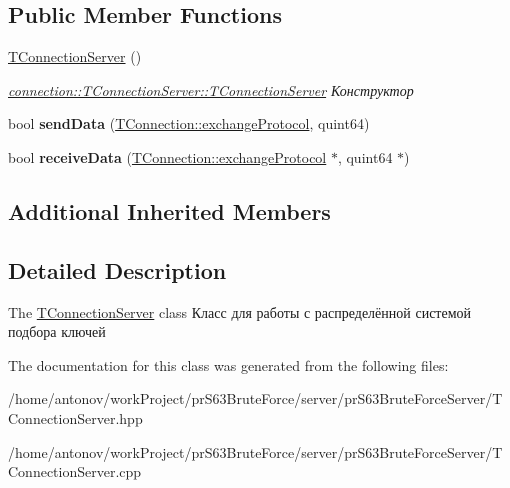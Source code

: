 \subsection*{Public Member Functions}
\begin{DoxyCompactItemize}
\item 
\mbox{\label{classconnection_1_1_t_connection_server_a823a7c07aaea7a3ab3ea1a854a1cd3a0}} 
\hyperlink{classconnection_1_1_t_connection_server_a823a7c07aaea7a3ab3ea1a854a1cd3a0}{T\+Connection\+Server} ()
\begin{DoxyCompactList}\small\item\em \hyperlink{classconnection_1_1_t_connection_server_a823a7c07aaea7a3ab3ea1a854a1cd3a0}{connection\+::\+T\+Connection\+Server\+::\+T\+Connection\+Server} Конструктор \end{DoxyCompactList}\item 
\mbox{\label{classconnection_1_1_t_connection_server_a481b658bc12f7bb0b5fee3ccef2937ff}} 
bool {\bfseries send\+Data} (\hyperlink{classconnection_1_1_t_connection_a3550181cb2fa72eccfa55d23f45cea34}{T\+Connection\+::exchange\+Protocol}, quint64)
\item 
\mbox{\label{classconnection_1_1_t_connection_server_a40b7cdfa826bf501fdb165e965511736}} 
bool {\bfseries receive\+Data} (\hyperlink{classconnection_1_1_t_connection_a3550181cb2fa72eccfa55d23f45cea34}{T\+Connection\+::exchange\+Protocol} $\ast$, quint64 $\ast$)
\end{DoxyCompactItemize}
\subsection*{Additional Inherited Members}


\subsection{Detailed Description}
The \hyperlink{classconnection_1_1_t_connection_server}{T\+Connection\+Server} class Класс для работы с распределённой системой подбора ключей 

The documentation for this class was generated from the following files\+:\begin{DoxyCompactItemize}
\item 
/home/antonov/work\+Project/pr\+S63\+Brute\+Force/server/pr\+S63\+Brute\+Force\+Server/T\+Connection\+Server.\+hpp\item 
/home/antonov/work\+Project/pr\+S63\+Brute\+Force/server/pr\+S63\+Brute\+Force\+Server/T\+Connection\+Server.\+cpp\end{DoxyCompactItemize}
